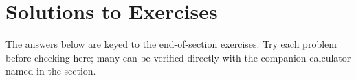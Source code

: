 \documentclass[11pt,openany]{book}
\begin{document}
\tableofcontents

\mainmatter


\backmatter




\chapter{Solutions to Exercises}
The answers below are keyed to the end-of-section exercises. Try each problem
before checking here; many can be verified directly with the companion
calculator named in the section.



\end{document}
